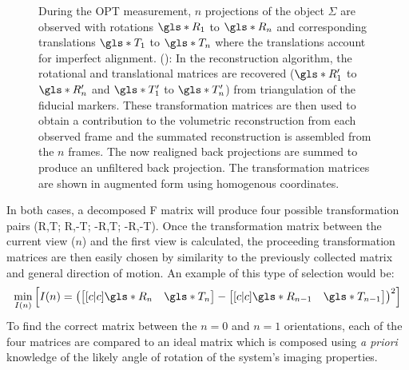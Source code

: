 \documentclass{osa-article}
\begin{document}
\begin{figure}
{    During the OPT measurement, \(n\) projections of the object \(\Sigma \) are observed with rotations \(\gls*{R}_1\) to \(\gls*{R}_n\) and corresponding translations \(\gls*{T}_1\) to \(\gls*{T}_n\) where the translations account for imperfect alignment.
    (): In the reconstruction algorithm, the rotational and translational matrices are recovered (\(\gls*{R}_1'\) to \(\gls*{R}_n'\) and \(\gls*{T}_1'\) to \(\gls*{T}_n'\)) from triangulation of the fiducial markers.
    These transformation matrices are then used to obtain a contribution to the volumetric reconstruction from each observed frame and the summated reconstruction is assembled from the \(n\) frames.
    The now realigned back projections are summed to produce an unfiltered back projection.
    The transformation matrices are shown in augmented form using homogenous coordinates.
  }\label{fig:flopt_algorithm} %
\end{figure}


In both cases, a decomposed \gls*{F} matrix will produce four possible transformation pairs (\gls*{R},\gls*{T}; \gls*{R},-\gls*{T}; -\gls*{R},\gls*{T}; -\gls*{R},-\gls*{T}).
Once the transformation matrix between the current view (\(n\)) and the first view is calculated, the proceeding transformation matrices are then easily chosen by similarity to the previously collected matrix and general direction of motion.
An example of this type of selection would be:
\begin{align}
  \min_{I(n)}\left[I(n) = \left(\begin{bmatrix}[c|c] \gls*{R}_n&\gls*{T}_n \end{bmatrix} - \begin{bmatrix}[c|c] \gls*{R}_{n-1}&\gls*{T}_{n-1} \end{bmatrix}\right)^2\right]
\end{align}
To find the correct matrix between the \(n=0\) and \(n=1\) orientations, each of the four matrices are compared to an ideal matrix which is composed using \emph{a priori} knowledge of the likely angle of rotation of the system's imaging properties.
\end{document}
